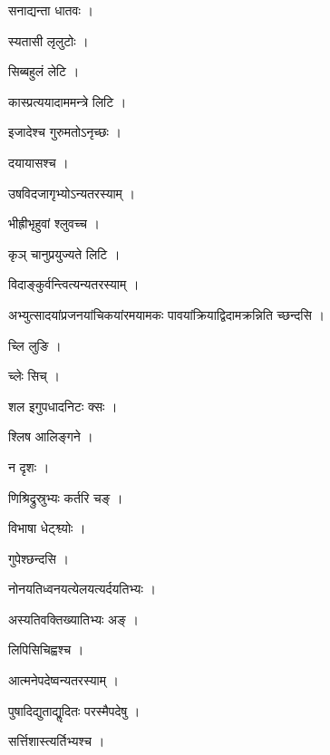 \documentclass[10pt, openany]{book}
\begin{document}
\noindent सनाद्यन्ता धातवः ।

\noindent स्यतासी लृलुटोः ।

\noindent सिब्बहुलं लेटि ।

\noindent कास्प्रत्ययादाममन्त्रे लिटि ।

\noindent इजादेश्च गुरुमतोऽनृच्छः ।

\noindent दयायासश्च ।

\noindent उषविदजागृभ्योऽन्यतरस्याम् ।

\noindent भीह्रीभृहुवां श्लुवच्च ।

\noindent कृञ् चानुप्रयुज्यते लिटि ।

\noindent विदाङ्कुर्वन्त्वित्यन्यतरस्याम् ।

\noindent अभ्युत्सादयांप्रजनयांचिकयांरमयामकः पावयांक्रियाद्विदामक्रन्निति च्छन्दसि ।

\noindent च्लि लुङि ।

\noindent च्लेः सिच् ।

\noindent शल इगुपधादनिटः क्सः ।

\noindent श्लिष आलिङ्गने ।

\noindent न दृशः ।

\noindent णिश्रिद्रुस्रुभ्यः कर्तरि चङ् ।

\noindent विभाषा धेट्श्व्योः ।

\noindent गुपेश्छन्दसि ।

\noindent नोनयतिध्वनयत्येलयत्यर्दयतिभ्यः ।

\noindent अस्यतिवक्तिख्यातिभ्यः अङ् ।

\noindent लिपिसिचिह्वश्च ।

\noindent आत्मनेपदेष्वन्यतरस्याम् ।

\noindent पुषादिद्युताद्यॢदितः परस्मैपदेषु ।

\noindent सर्त्तिशास्त्यर्तिभ्यश्च ।
\end{document}
